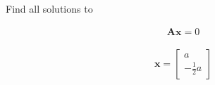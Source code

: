 Find all solutions to

\begin{align*}
    \boldsymbol{Ax} = 0
\end{align*}

\begin{solution}
    \begin{align*}
        \boldsymbol{x} = \begin{bmatrix}
            a \\ -\frac{1}{2}a
        \end{bmatrix}
    \end{align*}
\end{solution}